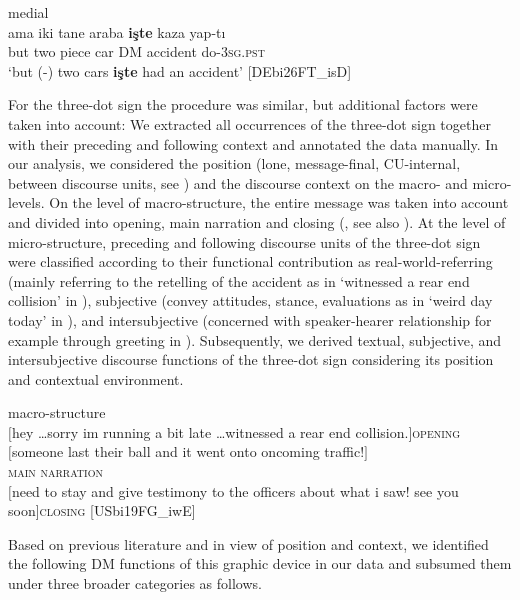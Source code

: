 \documentclass[output=paper,colorlinks,citecolor=brown]{langscibook}
\begin{document}
\ea medial \label{ex:labrenzetal:3}\\
\gll ama iki tane araba \textbf{işte} kaza yap-tı \\ but two piece car \textsc{DM} accident do-\textsc{3sg.pst} \\
\glt `but (-) two cars \textbf{işte} had an accident' \hfill [DEbi26FT\_isD]
\z

\noindent For the three-dot sign the procedure was similar, but additional factors were taken into account: We extracted all occurrences of the three-dot sign together with their preceding and following context and annotated the data manually. In our analysis, we considered the position (lone, message-final, CU-internal, between discourse units, see ) and the discourse context on the macro- and micro-levels. On the level of macro-structure, the entire message was taken into account and divided into opening, main narration and closing (, see also \cite{chapters/15}). At the level of micro-structure, preceding and following discourse units of the three-dot sign were classified according to their functional contribution as real-world-referring (mainly referring to the retelling of the accident as in ‘witnessed a rear end collision’ in ), subjective (convey attitudes, stance, evaluations as in ‘weird day today’ in ), and intersubjective (concerned with speaker-hearer relationship for example through greeting in  \citep[255]{labrenz_three-dot_2022}). Subsequently, we derived textual, subjective, and intersubjective discourse functions of the three-dot sign considering its position and contextual environment.

\ea macro-structure \\
$[$hey \dots  sorry im running a bit late \dots witnessed a rear end collision.$]$\textsc{opening}\\ $[$someone last their ball and it went onto oncoming traffic!$]$\\ 
\textsc{main narration}\\
$[$need to stay and give testimony to the officers about what i saw! see you soon]\textsc{closing} \hfill[USbi19FG\_iwE] \label{ex:labrenzetal:4}\\

\z

\noindent Based on previous literature \citep[e.g.][]{androutsopoulos_auslassungspunkte_2020, busch_digitale_2021, meibauer_how_2019} and in view of position and context, we identified the following DM functions of this graphic device in our data and subsumed them under three broader categories as follows. 
\end{document}
